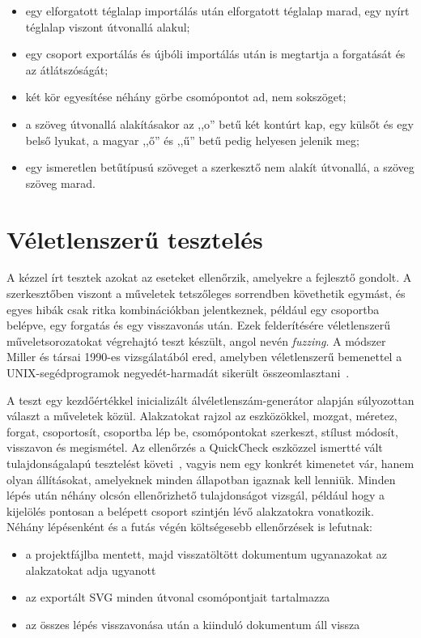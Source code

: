 \begin{itemize}
\item egy elforgatott téglalap importálás után elforgatott téglalap marad, egy nyírt téglalap viszont útvonallá alakul;
\item egy csoport exportálás és újbóli importálás után is megtartja a forgatását és az átlátszóságát;
\item két kör egyesítése néhány görbe csomópontot ad, nem sokszöget;
\item a szöveg útvonallá alakításakor az ,,o'' betű két kontúrt kap, egy külsőt és egy belső lyukat, a magyar ,,ő'' és ,,ű'' betű pedig helyesen jelenik meg;
\item egy ismeretlen betűtípusú szöveget a szerkesztő nem alakít útvonallá, a szöveg szöveg marad.
\end{itemize}

\section{Véletlenszerű tesztelés}
\label{sec:fuzz}

A kézzel írt tesztek azokat az eseteket ellenőrzik, amelyekre a fejlesztő gondolt. A szerkesztőben viszont a műveletek tetszőleges sorrendben követhetik egymást, és egyes hibák csak ritka kombinációkban jelentkeznek, például egy csoportba belépve, egy forgatás és egy visszavonás után. Ezek felderítésére véletlenszerű műveletsorozatokat végrehajtó teszt készült, angol nevén \textit{fuzzing}. A módszer Miller és társai 1990-es vizsgálatából ered, amelyben véletlenszerű bemenettel a UNIX-segédprogramok negyedét-harmadát sikerült összeomlasztani~\cite{miller1990}.

A teszt egy kezdőértékkel inicializált álvéletlenszám-generátor alapján súlyozottan választ a műveletek közül. Alakzatokat rajzol az eszközökkel, mozgat, méretez, forgat, csoportosít, csoportba lép be, csomópontokat szerkeszt, stílust módosít, visszavon és megismétel. Az ellenőrzés a QuickCheck eszközzel ismertté vált tulajdonságalapú tesztelést követi~\cite{claessen2000}, vagyis nem egy konkrét kimenetet vár, hanem olyan állításokat, amelyeknek minden állapotban igaznak kell lenniük. Minden lépés után néhány olcsón ellenőrizhető tulajdonságot vizsgál, például hogy a kijelölés pontosan a belépett csoport szintjén lévő alakzatokra vonatkozik. Néhány lépésenként és a futás végén költségesebb ellenőrzések is lefutnak:

\begin{itemize}
\item a projektfájlba mentett, majd visszatöltött dokumentum ugyanazokat az alakzatokat adja ugyanott
\item az exportált SVG minden útvonal csomópontjait tartalmazza
\item az összes lépés visszavonása után a kiinduló dokumentum áll vissza
\end{itemize}

